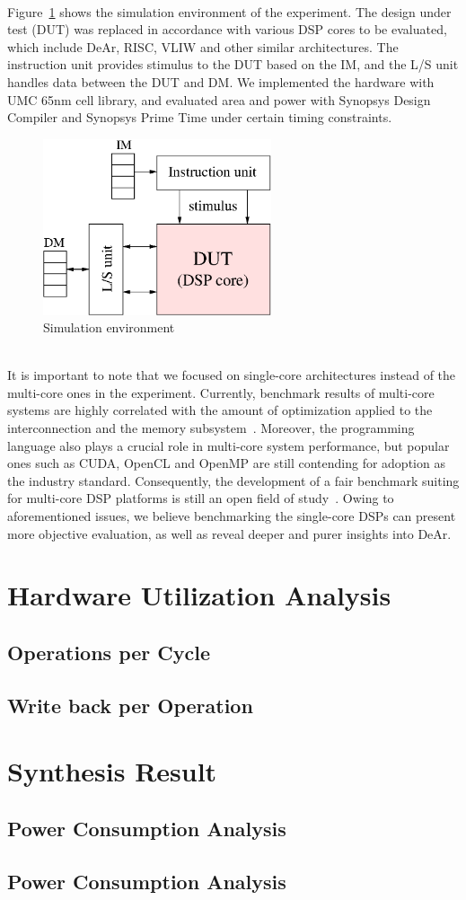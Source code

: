 \\\indent Figure~\ref{fig:sim} shows the simulation environment of the experiment.
The design under test (DUT) was replaced in accordance with various DSP cores to be evaluated, 
which include DeAr, RISC, VLIW and other similar architectures.
The instruction unit provides stimulus to the DUT based on the IM,
and the L/S unit handles data between the DUT and DM.
We implemented the hardware with UMC 65nm cell library, 
and evaluated area and power with Synopsys Design Compiler and Synopsys Prime Time under certain timing constraints.
\vspace{\textfig}
\begin{figure}[!ht] 
    \centering
    \includegraphics[width=0.6\textwidth]{./figs/sim.eps}
    \caption{Simulation environment}
    \label{fig:sim}
\end{figure}
\\\indent It is important to note that we focused on single-core architectures instead of the multi-core ones in the experiment.
Currently, benchmark results of multi-core systems are highly correlated with the amount of optimization applied to the interconnection and the memory subsystem~\cite{trends}.
Moreover, the programming language also plays a crucial role in multi-core system performance, 
but popular ones such as CUDA, OpenCL and OpenMP are still contending for adoption as the industry standard.
Consequently, the development of a fair benchmark suiting for multi-core DSP platforms is still an open field of study~\cite{landscape}.
Owing to aforementioned issues, we believe benchmarking the single-core DSPs can present more objective evaluation, 
as well as reveal deeper and purer insights into DeAr.
\section{Hardware Utilization Analysis}
{
    \subsection{Operations per Cycle}
    \subsection{Write back per Operation}
}
\section{Synthesis Result}
{
    \subsection{Power Consumption Analysis}
    \subsection{Power Consumption Analysis}
}


